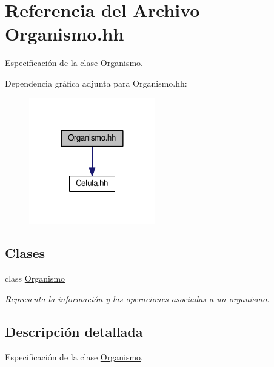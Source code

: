 \hypertarget{_organismo_8hh}{}\section{Referencia del Archivo Organismo.\+hh}
\label{_organismo_8hh}


Especificación de la clase \hyperlink{class_organismo}{Organismo}.  


Dependencia gráfica adjunta para Organismo.\+hh\+:
\nopagebreak
\begin{figure}[H]
\begin{center}
\leavevmode
\includegraphics[width=156pt]{_organismo_8hh__incl}
\end{center}
\end{figure}
\subsection*{Clases}
\begin{DoxyCompactItemize}
\item 
class \hyperlink{class_organismo}{Organismo}
\begin{DoxyCompactList}\small\item\em Representa la información y las operaciones asociadas a un organismo. \end{DoxyCompactList}\end{DoxyCompactItemize}


\subsection{Descripción detallada}
Especificación de la clase \hyperlink{class_organismo}{Organismo}. 

